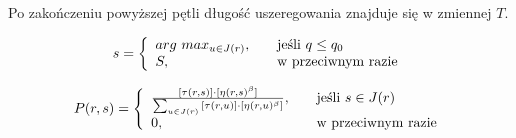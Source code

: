 \documentclass[10pt,a4paper]{article}
\begin{document}
Po zakończeniu powyższej pętli długość uszeregowania znajduje się w zmiennej
$T$. 


\begin{equation}
 s = \left\{ 
  \begin{array}{l l}
    arg\ max_{u \in J(r)}, & \quad \text{jeśli $q\leq q_0$}\\
    S, & \quad \text{w przeciwnym razie}
  \end{array} \right.
\end{equation}

\begin{equation}
 P(r,s) = \left\{ 
  \begin{array}{l l}
    \frac{[\tau (r,s)] \cdot [\eta (r,s)^\beta]}{\sum_{u \in J(r)} {[\tau (r,u)]
    \cdot [\eta (r,u)^\beta]}},
    & \quad \text{jeśli }s \in J(r)\\
     0, & \quad \text{w przeciwnym razie}
  \end{array} \right.
\end{equation}
\end{document}
